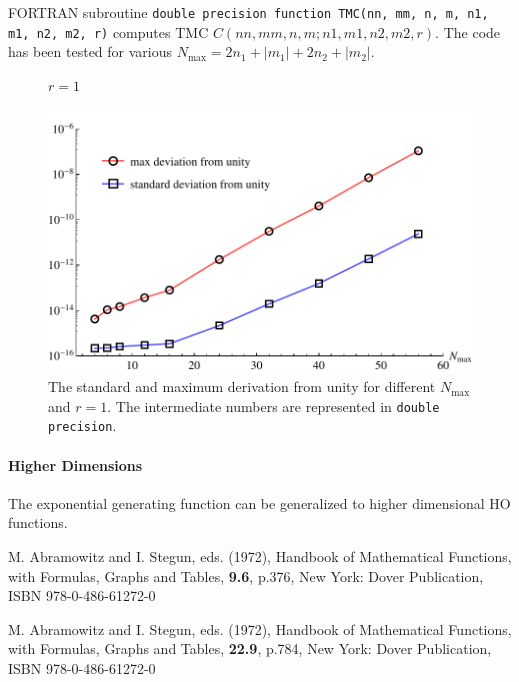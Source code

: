 \documentclass[a4paper,10pt]{article}
\begin{document}
FORTRAN subroutine \texttt{double precision function TMC(nn, mm, n, m, n1, m1, n2, m2, r)} computes TMC 
$C(nn,mm,n,m;n1,m1,n2,m2, r)$. The code has been tested for various $N_{\max} = 2n_1+|m_1|+2n_2+|m_2|$.
%
\begin{figure}[ht]
 \centering 
\caption{$r = 1$}
\end{figure}
%
\begin{figure}[ht]
 \centering 
 \includegraphics[width=.6\textwidth]{deviation.pdf}
 \caption{The standard and maximum derivation from unity for different $N_{\max}$ and $r=1$. 
The intermediate numbers are represented in \texttt{double precision}. }
\end{figure}

\paragraph{Higher Dimensions} The exponential generating function can be generalized to higher dimensional HO functions.


\begin{thebibliography}{9}

 M. Abramowitz and I. Stegun, eds. (1972),
Handbook of Mathematical Functions, with Formulas, Graphs and Tables, 
\textbf{9.6}, p.376,
New York: Dover Publication, ISBN 978-0-486-61272-0

 M. Abramowitz and I. Stegun, eds. (1972),
Handbook of Mathematical Functions, with Formulas, Graphs and Tables, 
\textbf{22.9}, p.784,
New York: Dover Publication, ISBN 978-0-486-61272-0



\end{thebibliography}
\end{document}
